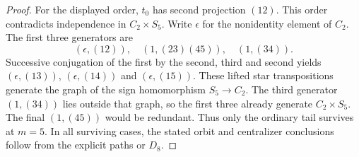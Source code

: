 \documentclass[11pt,a4paper]{article}
\begin{document}
\begin{proof}
For the displayed order, $t_0$ has second projection $(12)$.
This order contradicts independence in $C_2\times S_5$.
Write $\epsilon$ for the nonidentity element of $C_2$.
The first three generators are
\[
 (\epsilon,(12)),\quad(1,(23)(45)),\quad(1,(34)).
\]
Successive conjugation of the first by the second, third and
second yields $(\epsilon,(13))$, $(\epsilon,(14))$ and
$(\epsilon,(15))$. These lifted star transpositions generate
the graph of the sign homomorphism $S_5\to C_2$.
The third generator $(1,(34))$ lies outside that graph, so the
first three already generate $C_2\times S_5$. The final
$(1,(45))$ would be redundant. Thus only the ordinary tail
survives at $m=5$. In all surviving cases, the stated orbit and
centralizer conclusions follow from the explicit paths or $D_8$.
\end{proof}
\end{document}
